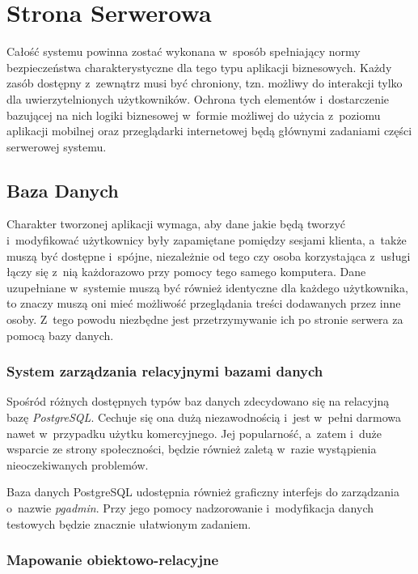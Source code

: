 \documentclass[11pt]{aghdpl}
\begin{document}
\section {Strona Serwerowa}

Całość systemu powinna zostać wykonana w~sposób spełniający normy bezpieczeństwa charakterystyczne dla tego typu aplikacji biznesowych. Każdy zasób dostępny z~zewnątrz musi być chroniony, tzn. możliwy do interakcji tylko dla uwierzytelnionych użytkowników. Ochrona tych elementów i~dostarczenie bazującej na nich logiki biznesowej w~formie możliwej do użycia z~poziomu aplikacji mobilnej oraz przeglądarki internetowej będą głównymi zadaniami części serwerowej systemu.

\subsection{Baza Danych}
\label{sec:bazaDanych}

Charakter tworzonej aplikacji wymaga, aby dane jakie będą tworzyć i~modyfikować użytkownicy były zapamiętane pomiędzy sesjami klienta, a~także muszą być dostępne i~spójne, niezależnie od tego czy osoba korzystająca z~usługi łączy się z~nią każdorazowo przy pomocy tego samego komputera. Dane uzupełniane w~systemie muszą być również identyczne dla każdego użytkownika, to znaczy muszą oni mieć możliwość przeglądania treści dodawanych przez inne osoby. Z~tego powodu niezbędne jest przetrzymywanie ich po stronie serwera za pomocą bazy danych.

\subsubsection{System zarządzania relacyjnymi bazami danych}

Spośród różnych dostępnych typów baz danych zdecydowano się na relacyjną bazę \emph{PostgreSQL}. Cechuje się ona dużą niezawodnością i~jest w~pełni darmowa nawet w~przypadku użytku komercyjnego. Jej popularność, a~zatem i~duże wsparcie ze strony społeczności, będzie również zaletą w~razie wystąpienia nieoczekiwanych problemów.

Baza danych PostgreSQL udostępnia również graficzny interfejs do zarządzania o~nazwie \emph{pgadmin}. Przy jego pomocy nadzorowanie i~modyfikacja danych testowych będzie znacznie ułatwionym zadaniem.

\subsubsection{Mapowanie obiektowo-relacyjne}
\end{document}
